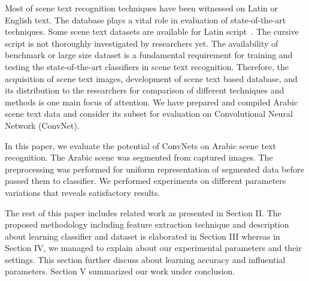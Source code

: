 \documentclass[conference]{IEEEtran}
\begin{document}
Most of scene text recognition techniques have been witnessed on Latin or English text.
The  database plays a vital role in evaluation of state-of-the-art techniques.
Some scene text datasets are available for Latin script~\cite{it,tm}.
The cursive script is not thoroughly investigated by researchers yet.
The availability of benchmark or large size dataset is a fundamental requirement for training and testing the state-of-the-art classifiers in scene text recognition.
Therefore, the acquisition of scene text images, development of scene text based database, and its distribution to the researchers for comparison of different techniques and methods is one main focus of attention.
We have prepared and compiled  Arabic scene text data and consider its subset for evaluation on Convolutional Neural Network (ConvNet).

In this paper, we evaluate the potential of ConvNets on Arabic scene text recognition.
The Arabic scene was segmented from captured images.
The preprocessing was performed for uniform representation of segmented data before passed them to classifier.
We performed experiments on different parameters variations that reveals satisfactory results.

The rest of this paper includes related work as presented in Section II.
The proposed methodology including feature extraction technique and description about learning classifier and dataset is elaborated in Section III whereas in Section IV, we managed to explain about our experimental parameters and their settings.
This section further discuss about learning accuracy and influential parameters.
Section V summarized our work under conclusion.
\end{document}
